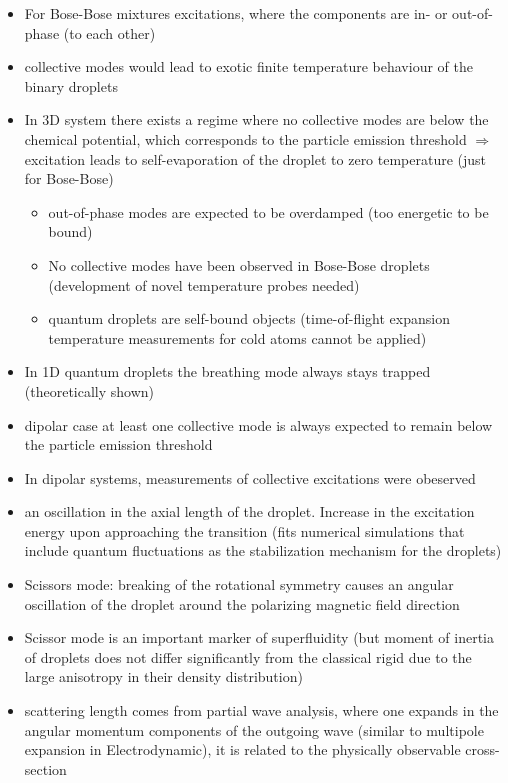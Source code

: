 \begin{itemize}
    \item For Bose-Bose mixtures excitations, where the components are in- or out-of- phase (to each other)
    \item collective modes would lead to exotic finite temperature behaviour of the binary droplets
    \item In 3D system there exists a regime where no collective modes are below the chemical potential, which corresponds to the particle emission threshold $\Rightarrow$ excitation leads to self-evaporation of the droplet to zero temperature (just for Bose-Bose)
    \begin{itemize}
        \item out-of-phase modes are expected to be overdamped (too energetic to be bound)
        \item No collective modes have been observed in Bose-Bose droplets (development of novel temperature probes needed)
        \item quantum droplets are self-bound objects (time-of-flight expansion temperature measurements for cold atoms cannot be applied)
    \end{itemize}
    \item In 1D quantum droplets the breathing mode always stays trapped (theoretically shown)
    \item dipolar case at least one collective mode is always expected to remain below the particle emission threshold
    \item In dipolar systems, measurements of collective excitations were obeserved
    \item an oscillation in the axial length of the droplet. Increase in the excitation energy upon approaching the transition (fits numerical simulations that include quantum fluctuations as the stabilization
mechanism for the droplets)
    \item Scissors mode: breaking of the rotational symmetry causes an angular oscillation of the droplet
around the polarizing magnetic field direction
    \item Scissor mode is an important marker of superfluidity (but moment of inertia of droplets does not differ significantly from the classical rigid due to the large anisotropy in their density distribution)
    \item scattering length comes from partial wave analysis, where one expands in the angular momentum components of the outgoing wave (similar to multipole expansion in Electrodynamic), it is related to the physically observable cross-section
\end{itemize}


